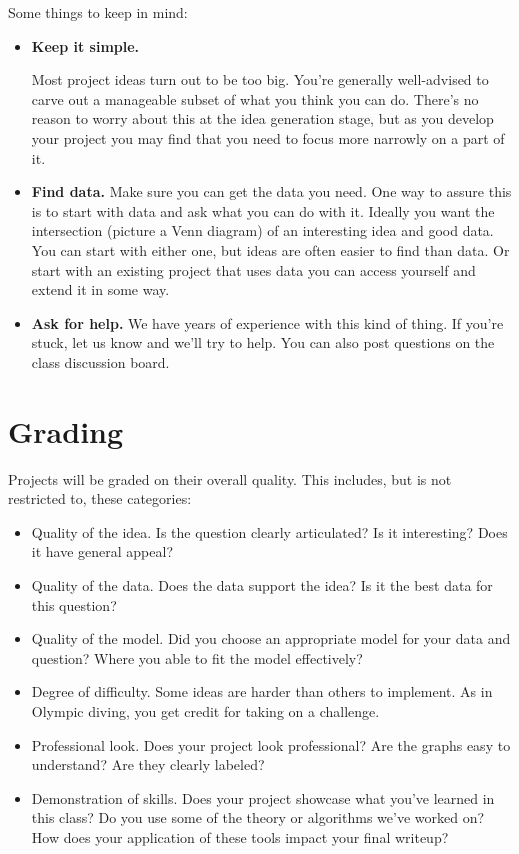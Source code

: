\documentclass[11pt]{article}
\begin{document}
Some things to keep in mind:
%
\begin{itemize}
      \item {\bf Keep it simple.}

            Most project ideas turn out to be too big.  You're generally well-advised to
            carve out a manageable subset of what you think you can do. There's no reason to
            worry about this at the idea generation stage, but as you develop your project
            you may find that you need to focus more narrowly on a part of it.

      \item {\bf Find data.}  Make sure you can get the data you need. One way to
            assure this is to start with data and ask what you can do with it. Ideally you
            want the intersection (picture a Venn diagram) of an interesting idea and good
            data.  You can start with either one, but ideas are often easier to find than
            data. Or start with an existing project that uses data you can access yourself
            and extend it in some way.


      \item {\bf Ask for help.}
            We have years of experience with this kind of thing. If you're stuck, let us
            know and we'll try to help. You can also post questions on the class discussion
            board.

\end{itemize}


\section*{Grading}

Projects will be graded on their overall quality.  This includes, but is not
restricted to, these categories:
%
\begin{itemize}
      \item Quality of the idea.  Is the question clearly articulated?  Is it
            interesting? Does it have general appeal?
      \item Quality of the data.  Does the data support the idea? Is it the best data
            for this question?
      \item Quality of the model.  Did you choose an appropriate model for your data
            and question? Where you able to fit the model effectively?
      \item Degree of difficulty.  Some ideas are harder than others to implement. As
            in Olympic diving, you get credit for taking on a challenge.
      \item Professional look.  Does your project look professional?  Are the graphs
            easy to understand?  Are they clearly labeled?
      \item Demonstration of skills. Does your project showcase what you've learned in
            this class? Do you use some of the theory or algorithms we've worked on? How
            does your application of these tools impact your final writeup?
\end{itemize}
\end{document}
